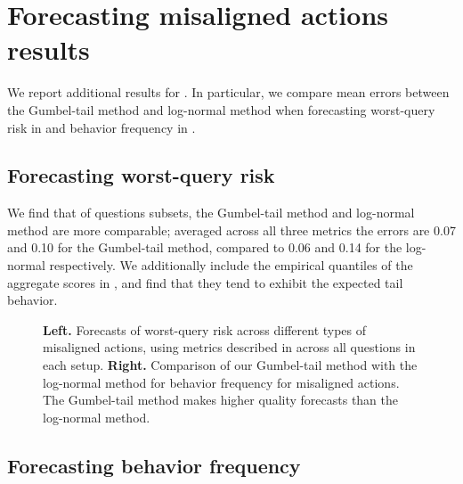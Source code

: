 \newpage

\section{Forecasting misaligned actions results}


We report additional results for . In particular, we compare mean errors between the Gumbel-tail method and log-normal method when forecasting worst-query risk in  and behavior frequency in .


\subsection{Forecasting worst-query risk}
\label{sec:misalignment-worst-query-risk}

We find that of questions subsets, the Gumbel-tail method and log-normal method are more comparable; averaged across all three metrics the errors are 0.07 and 0.10 for the Gumbel-tail method, compared to 0.06 and 0.14 for the log-normal respectively. We additionally include the empirical quantiles of the aggregate scores in , and find that they tend to exhibit the expected tail behavior. 



\newpage


\begin{figure*}[t]
    \centering
    \caption{\textbf{Left.} Forecasts of worst-query risk across different types of misaligned actions, using metrics described in  across all questions in each setup. \textbf{Right.} Comparison of our Gumbel-tail method with the log-normal method for behavior frequency for misaligned actions. The Gumbel-tail method makes higher quality forecasts than the log-normal method.}
\end{figure*}


\subsection{Forecasting behavior frequency}
\label{sec:misalignment-behavior-frequency}



